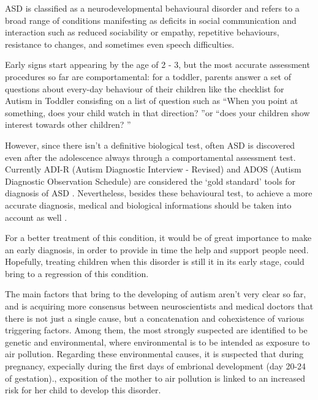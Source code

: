 \documentclass[10pt]{report}
\begin{document}
ASD is classified as a neurodevelopmental behavioural disorder \cite{guze-1995} \cite{who-1993} and refers to a broad range of conditions manifesting as deficits in social communication and interaction such as reduced sociability or empathy, repetitive behaviours, resistance to changes, and sometimes even speech difficulties.\cite{rapin-2008}


Early signs start appearing by the age of 2 - 3, but the most accurate assessment procedures so far are comportamental: for a toddler, parents answer a set of questions about every-day behaviour of their children like the checklist for Autism in Toddler \cite{robins-2009} consisfing on a list of question such as \textquotedblleft When you point at something, does your child watch in that direction? \textquotedblright or \textquotedblleft does your children show interest towards other children? \textquotedblright

However, since there isn't a definitive biological test, often ASD is discovered even after the adolescence always through a comportamental assessment test.
Currently ADI-R (Autism Diagnostic Interview - Revised) and ADOS (Autism Diagnostic Observation Schedule) are considered the ‘gold standard’ tools for diagnosis of ASD \cite{ozonoff-2015} \cite{lecouteur-2008}.
Nevertheless, besides these behavioural test, to achieve a more accurate diagnosis, medical and biological informations should be taken into account as well .

For a better treatment of this condition, it would be of great importance to make an early diagnosis, in order to provide in time the help and support people need.
Hopefully, treating children when this disorder is still it in its early stage, could bring to a regression of this condition.

The main factors that bring to the developing of autism aren't very clear so far, and is acquiring more consensus between neuroscientists and medical doctors that there is not just a single cause, but a concatenation and cohexistence of various triggering factors.
Among them, the most strongly suspected are identified to be genetic and environmental, where environmental is to be intended as exposure to air pollution.
Regarding these environmental causes, it is suspected that during pregnancy, expecially during the first days of embrional development (day 20-24 of gestation).\cite{ratajczak-2011}, exposition of the mother to air pollution is linked to an increased risk for her child to develop this disorder.
\end{document}
